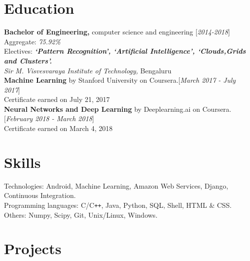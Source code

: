 \documentclass[10pt]{article}
\renewcommand{\textbf}[1]{{\bfseries\sffamily\color{accent_darkest}#1}}
\begin{document}
\section*{Education} \textbf{Bachelor of Engineering,} computer science
and engineering \hfill \textcolor{grey_darker}{[\textit{2014-2018}]}\\
Aggregate: \textit{75.92\%}\\
Electives: \textbf{\textit{`Pattern Recognition', `Artificial Intelligence',
`Clouds,Grids and Clusters'.}}\\
\textit{Sir M. Visvesvaraya Institute of Technology,} Bengaluru
\medskip
\\
\textbf{Machine Learning} by Stanford University on Coursera.\hfill  \textcolor{grey_darker}{[\textit
{March 2017 - July 2017}]}\\
Certificate earned on July 21, 2017
\medskip\\ 
\textbf{Neural Networks and Deep Learning} by Deeplearning.ai on Coursera.\hfill  \textcolor{grey_darker}{[\textit
{February 2018 - March 2018}]}\\
Certificate earned on March 4, 2018 

\section*{Skills} Technologies: Android, Machine Learning, Amazon Web
Services, Django, Continuous Integration.\\
Programming languages: C/C\texttt{++}, Java, Python, SQL, Shell,
HTML \& CSS.\\
Others: Numpy, Scipy, Git, Unix/Linux, Windows. 

\section*{Projects}
\end{document}
